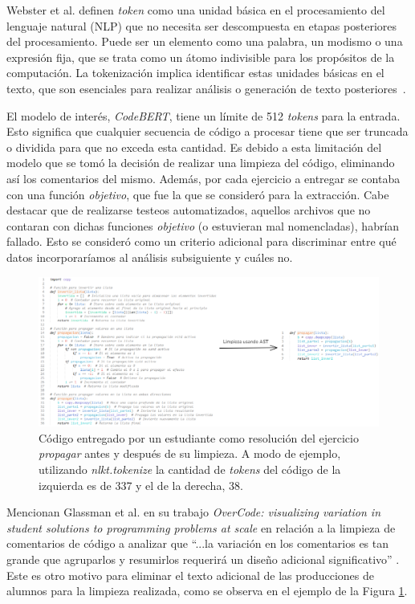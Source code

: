 \documentclass[11pt,a4paper,twoside,openany]{tesis}
\begin{document}
Webster et al. definen \emph{token} como una unidad básica en el procesamiento del lenguaje natural (NLP) que no necesita ser descompuesta en etapas posteriores del procesamiento. Puede ser un elemento como una palabra, un modismo o una expresión fija, que se trata como un átomo indivisible para los propósitos de la computación. La tokenización implica identificar estas unidades básicas en el texto, que son esenciales para realizar análisis o generación de texto posteriores~\cite{tokens}.

El modelo de interés, \emph{CodeBERT}, tiene un límite de 512 \emph{tokens} para la entrada. Esto significa que cualquier secuencia de código a procesar tiene que ser truncada o dividida para que no exceda esta cantidad. Es debido a esta limitación del modelo que se tomó la decisión de realizar una limpieza del código, eliminando así los comentarios del mismo. Además, por cada ejercicio a entregar se contaba con una función \emph{objetivo}, que fue la que se consideró para la extracción. Cabe destacar que de realizarse testeos automatizados, aquellos archivos que no contaran con dichas funciones \emph{objetivo} (o estuvieran mal nomencladas), habrían fallado. Esto se consideró como un criterio adicional para discriminar entre qué datos incorporaríamos al análisis subsiguiente y cuáles no. 

\begin{figure}[H]
    \centering
    \includegraphics[width=1\textwidth]{imagenes/ast.PNG}
    \caption{Código entregado por un estudiante como resolución del ejercicio \emph{propagar} antes y después de su limpieza. A modo de ejemplo, utilizando \emph{nlkt.tokenize} la cantidad de \emph{tokens} del código de la izquierda es de 337 y el de la derecha, 38.}
      \label{limpieza}
\end{figure}

Mencionan Glassman et al. en su trabajo \emph{OverCode: visualizing variation in student solutions to programming problems at scale} \cite{overcode} en relación a la limpieza de comentarios de código a analizar que ``...la variación en los comentarios es tan grande que agruparlos y resumirlos requerirá un diseño adicional significativo'' . Este es otro motivo para eliminar el texto adicional de las producciones de alumnos para la limpieza realizada, como se observa en el ejemplo de la Figura \ref{limpieza}.
\end{document}
